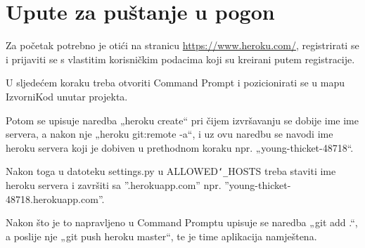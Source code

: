 			\eject
		
		\section{Upute za puštanje u pogon}
		
			\noindent Za početak potrebno je otići na stranicu \url{https://www.heroku.com/}, registrirati se i prijaviti se s vlastitim korisničkim podacima koji su kreirani putem registracije. 
			
			\noindent U sljedećem koraku treba otvoriti Command Prompt i pozicionirati se u mapu IzvorniKod unutar projekta.
			
			\noindent Potom se upisuje naredba „heroku create“ pri čijem izvršavanju se dobije ime ime servera, a nakon nje „heroku git:remote -a“, i uz ovu naredbu se navodi ime heroku servera koji je dobiven u prethodnom koraku npr. „young-thicket-48718“.
			
			\noindent Nakon toga u datoteku settings.py u ALLOWED\texttt{\char`_}HOSTS treba staviti ime heroku servera i završiti sa ''.herokuapp.com'' npr. ''young-thicket-48718.herokuapp.com''. 
			
			\noindent Nakon što je to napravljeno u Command Promptu upisuje se naredba „git add .“, a poslije nje „git push heroku master“, te je time aplikacija namještena.
			
			
			\eject 